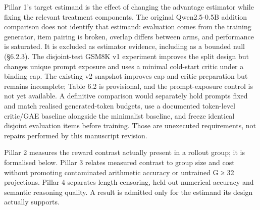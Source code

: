 \documentclass[12pt,a4paper]{report}
\begin{document}
Pillar 1's target estimand is the effect of changing the advantage
estimator while fixing the relevant treatment components. The original
Qwen2.5-0.5B addition comparison does not identify that estimand:
evaluation comes from the training generator, item pairing is broken,
overlap differs between arms, and performance is saturated. It is
excluded as estimator evidence, including as a bounded null (§6.2.3).
The disjoint-test GSM8K v1 experiment improves the split design but
changes unique prompt exposure and uses a minimal cold-start critic
under a binding cap. The existing v2 snapshot improves cap and critic
preparation but remains incomplete; Table 6.2 is provisional, and the
prompt-exposure control is not yet available. A definitive comparison
would separately hold prompts fixed and match realised generated-token
budgets, use a documented token-level critic/GAE baseline alongside the
minimalist baseline, and freeze identical disjoint evaluation items
before training. Those are unexecuted requirements, not repairs
performed by this manuscript revision.

Pillar 2 measures the reward contrast actually present in a rollout
group; it is formalised below. Pillar 3 relates measured contrast to
group size and cost without promoting contaminated arithmetic accuracy
or untrained G ≥ 32 projections. Pillar 4 separates length censoring,
held-out numerical accuracy and semantic reasoning quality. A result is
admitted only for the estimand its design actually supports.
\end{document}
